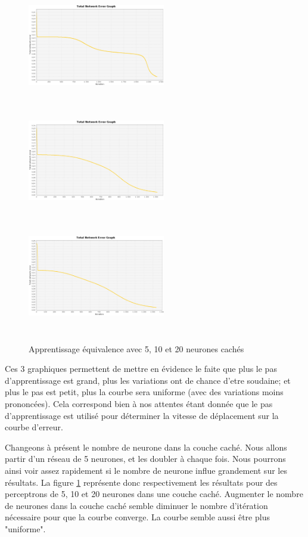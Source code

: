 \documentclass[twoside,openright,a4paper,11pt,french]{article}
\begin{document}
\begin{figure}[ht]
\centering
\includegraphics[width=6cm,height=5cm]{./pics/eq/multi-5_eq_def.eps}
\includegraphics[width=6cm,height=5cm]{./pics/eq/multi-10_eq_def.eps}
\includegraphics[width=6cm,height=5cm]{./pics/eq/multi-20_eq_def.eps}
\caption{Apprentissage équivalence avec 5, 10 et 20 neurones cachés}
\label{fig:eqmult51020}
\end{figure}
\clearpage

Ces 3 graphiques permettent de mettre en évidence le faite que plus le pas
d'apprentissage est grand, plus les variations ont de chance d'etre soudaine;
et plus le pas est petit, plus la courbe sera uniforme (avec des variations
moins prononcées). Cela correspond bien à nos attentes étant donnée que le 
pas d'apprentissage est utilisé pour déterminer la vitesse de déplacement
sur la courbe d'erreur.  

Changeons à présent le nombre de neurone dans la couche caché.  Nous allons
partir d'un réseau de 5 neurones, et les doubler à chaque fois. Nous
pourrons ainsi voir assez rapidement si le nombre de neurone influe grandement
sur les résultats. La figure \ref{fig:eqmult51020} représente donc
respectivement les résultats pour des perceptrons de 5, 10 et 20 neurones dans
une couche caché.
Augmenter le nombre de neurones dans la couche caché semble diminuer le nombre
d'itération nécessaire pour que la courbe converge.
La courbe semble aussi être plus "uniforme".
\end{document}
